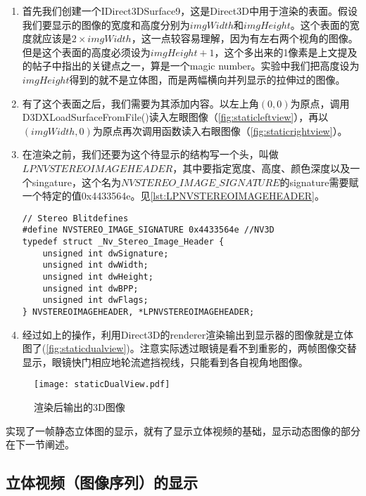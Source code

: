 \begin{enumerate}
\item 首先我们创建一个IDirect3DSurface9，这是Direct3D中用于渲染的表面。假设我们要显示的图像的宽度和高度分别为$imgWidth$和$imgHeight$。这个表面的宽度就应该是$2\times imgWidth$，这一点较容易理解，因为有左右两个视角的图像。但是这个表面的高度必须设为$imgHeight+1$，这个多出来的1像素是上文提及的帖子中指出的关键点之一，算是一个magic number。实验中我们把高度设为$imgHeight$得到的就不是立体图，而是两幅横向并列显示的拉伸过的图像。
\item 有了这个表面之后，我们需要为其添加内容。以左上角$(0,0)$为原点，调用D3DXLoadSurfaceFromFile()读入左眼图像（\autoref{fig:staticleftview}），再以$(imgWidth,0)$为原点再次调用函数读入右眼图像（\autoref{fig:staticrightview}）。
\item 在渲染之前，我们还要为这个待显示的结构写一个头，叫做$LPNVSTEREOIMAGEHEADER$，其中要指定宽度、高度、颜色深度以及一个singature，这个名为$NVSTEREO\_IMAGE\_SIGNATURE$的signature需要赋一个特定的值0x4433564e。见\autoref{lst:LPNVSTEREOIMAGEHEADER}。
\begin{lstlisting}[caption = {LPNVSTEREOIMAGEHEADER的结构}, label = lst:LPNVSTEREOIMAGEHEADER]
// Stereo Blitdefines
#define NVSTEREO_IMAGE_SIGNATURE 0x4433564e //NV3D
typedef struct _Nv_Stereo_Image_Header {
    unsigned int dwSignature;
    unsigned int dwWidth;
    unsigned int dwHeight;
    unsigned int dwBPP;
    unsigned int dwFlags;
} NVSTEREOIMAGEHEADER, *LPNVSTEREOIMAGEHEADER;
\end{lstlisting}
\item 经过如上的操作，利用Direct3D的renderer渲染输出到显示器的图像就是立体图了(\autoref{fig:staticdualview})。注意实际透过眼镜是看不到重影的，两帧图像交替显示，眼镜快门相应地轮流遮挡视线，只能看到各自视角地图像。
\end{enumerate}


\begin{figure}[htbp]
\begin{center}
\texttt{[image: staticDualView.pdf]}
\caption{渲染后输出的3D图像}
\label{fig:staticdualview}
\end{center}
\end{figure}

实现了一帧静态立体图的显示，就有了显示立体视频的基础，显示动态图像的部分在下一节阐述。

\subsection{立体视频（图像序列）的显示}
\label{subsec:motion3dimgdisp}

